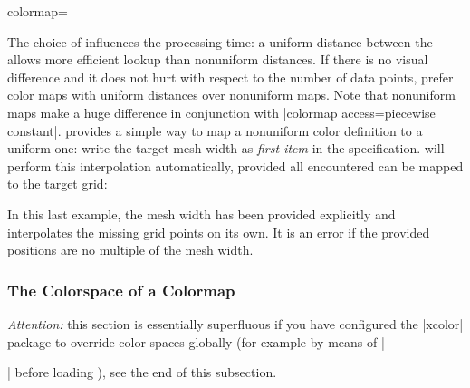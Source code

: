 \begin{pgfplotskey}{colormap=}
\begin{codeexample}[]
\end{codeexample}

    The choice of  influences the processing time: a uniform
    distance between the  allows more efficient lookup than
    nonuniform distances. If there is no visual difference and it does not hurt
    with respect to the number of data points, prefer color maps with uniform
    distances over nonuniform maps. Note that nonuniform maps make a huge
    difference in conjunction with |colormap access=piecewise constant|.
    \PGFPlots{} provides a simple way to map a nonuniform color definition to a
    uniform one: write the target mesh width as \emph{first item} in the
    specification. \PGFPlots{} will perform this interpolation automatically,
    provided all encountered  can be mapped to the target grid:

\begin{codeexample}[code only]
\end{codeexample}

    \noindent In this last example, the mesh width has been provided explicitly
    and \PGFPlots{} interpolates the missing grid points on its own. It is an
    error if the provided positions are no multiple of the mesh width.


    \subsubsection{The Colorspace of a Colormap}

    \emph{Attention:} this section is essentially superfluous if you have
    configured the |xcolor| package to override color spaces globally (for
    example by means of |\usepackage[cmyk]{xcolor}| before loading \PGFPlots),
    see the end of this subsection.


\end{pgfplotskey}
